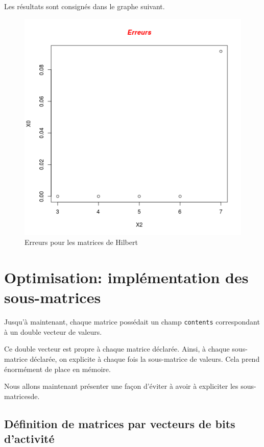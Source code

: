 \documentclass[a4paper,11pt]{article}
\begin{document}
Les résultats sont consignés dans le graphe suivant.


\begin{figure}
  \centering
  \includegraphics[scale=0.5]{Error.png}
  \caption{Erreurs pour les matrices de Hilbert}
  \label{fig:phd}

\end{figure}


\section{Optimisation: implémentation des sous-matrices}


Jusqu'à maintenant, chaque matrice possédait un champ \texttt{contents} correspondant à un double vecteur de valeurs.

Ce double vecteur est propre à chaque matrice déclarée. Ainsi, à chaque sous-matrice déclarée, on explicite à chaque fois la sous-matrice de valeurs. Cela prend énormément de place en mémoire.

Nous allons maintenant présenter une façon d'éviter à avoir à expliciter les sous-matricesde.

\subsection{Définition de matrices par vecteurs de bits d'activité}
\end{document}
